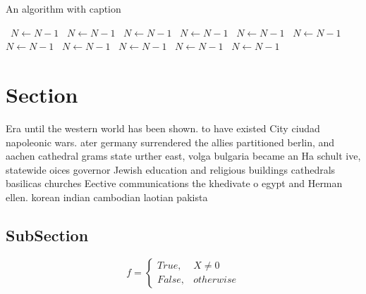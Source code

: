 \documentclass[a4paper]{article}
\begin{document}
\begin{algorithm}
\caption{An algorithm with caption}
\begin{algorithmic}
\    \State $N \gets N - 1$
\    \State $N \gets N - 1$
\    \State $N \gets N - 1$
\    \State $N \gets N - 1$
\    \State $N \gets N - 1$
\    \State $N \gets N - 1$
\    \State $N \gets N - 1$
\    \State $N \gets N - 1$
\    \State $N \gets N - 1$
\    \State $N \gets N - 1$
\    \State $N \gets N - 1$
\EndWhile
\end{algorithmic}
\end{algorithm}

\section{Section}

Era until the western world has been shown. to have existed City ciudad napoleonic wars. ater germany surrendered the allies partitioned berlin, and aachen cathedral grams state urther east, volga bulgaria became an Ha schult ive, statewide oices governor Jewish education and religious buildings cathedrals basilicas churches Eective communications the khedivate o egypt and Herman ellen. korean indian cambodian laotian pakista

\subsection{SubSection}

\begin{equation}   f =
\begin{cases} True, & X \neq 0\\
False, & otherwise
\end{cases}
\end{equation}
\end{document}
